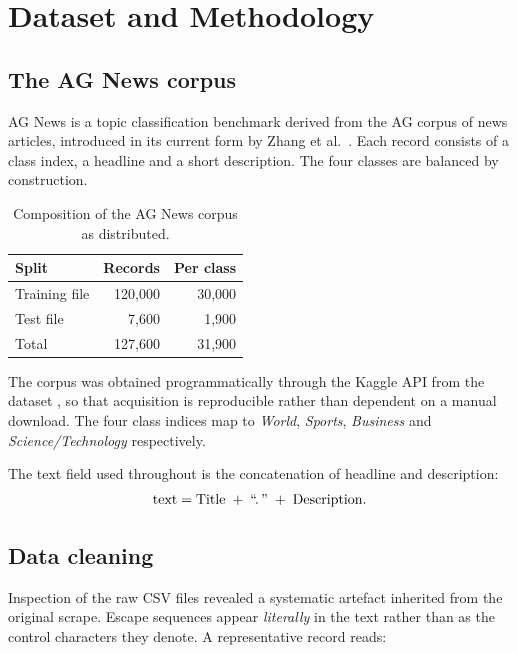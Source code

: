 \chapter{Dataset and Methodology}
\label{ch:method}

\section{The AG News corpus}

AG News is a topic classification benchmark derived from the AG corpus of news articles, introduced
in its current form by Zhang et al.\ \cite{zhang2015}. Each record consists of a class index, a
headline and a short description. The four classes are balanced by construction.

\begin{table}[ht]
\centering
\caption{Composition of the AG News corpus as distributed.}
\label{tab:corpus}
\begin{tabular}{lrr}
\toprule
\textbf{Split} & \textbf{Records} & \textbf{Per class} \\
\midrule
Training file & 120{,}000 & 30{,}000 \\
Test file     & 7{,}600   & 1{,}900 \\
\midrule
Total         & 127{,}600 & 31{,}900 \\
\bottomrule
\end{tabular}
\end{table}

The corpus was obtained programmatically through the Kaggle API from the dataset
, so that acquisition is reproducible rather than
dependent on a manual download. The four class indices map to \emph{World}, \emph{Sports},
\emph{Business} and \emph{Science/Technology} respectively.

The text field used throughout is the concatenation of headline and description:
\begin{equation*}
\text{text} = \text{Title} \;+\; \text{``.\,''} \;+\; \text{Description}.
\end{equation*}

\section{Data cleaning}
\label{sec:cleaning}

Inspection of the raw CSV files revealed a systematic artefact inherited from the original scrape.
Escape sequences appear \emph{literally} in the text rather than as the control characters they
denote. A representative record reads:

